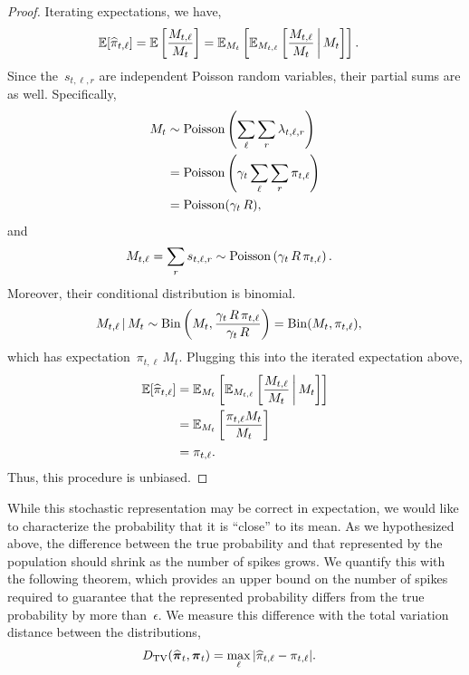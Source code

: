 \begin{proof}
  Iterating expectations, we have,
  \begin{align}
    \mathbb{E}[\widehat{\pi}_{t,\ell}] &=
    \mathbb{E} \left[ \frac{M_{t, \ell}}{M_{t}} \right] 
    = \mathbb{E}_{M_t} \left[
      \mathbb{E}_{M_{t,\ell}} \left[
        \frac{M_{t,\ell}}{M_t} \, \bigg|\,
        M_{t}  \right] \right].
  \end{align}
  Since the~$s_{t, \ell, r}$ are independent Poisson random variables, their partial
  sums are as well. Specifically,
  \begin{align}
    M_t &\sim \mathrm{Poisson} \left( \sum_{\ell} \sum_{r} \lambda_{t,\ell,r} \right) \\
    &= \mathrm{Poisson} \left(\gamma_t \sum_\ell \sum_r \pi_{t,\ell} \right) \\
    \label{eq:M_t_rate}
    &= \mathrm{Poisson}(\gamma_t \, R),
  \end{align}
  and
  \begin{align}
        M_{t,\ell} = \sum_r s_{t, \ell, r} &\sim \mathrm{Poisson} \left( \gamma_t \, R \, \pi_{t, \ell} \right).
  \end{align}
  Moreover, their conditional distribution is binomial.
  \begin{align}
    M_{t,\ell} \,|\, M_t &\sim
    \mathrm{Bin} \left( M_t, \frac{\gamma_t \, R \, \pi_{t,\ell}}{\gamma_t \, R} \right)
    =\mathrm{Bin}(M_t, \pi_{t,\ell}),
  \end{align}
  which has expectation~$\pi_{t,\ell} \, M_t$.
  Plugging this into the iterated expectation above, 
  \begin{align}
    \mathbb{E}[\widehat{\pi}_{t,\ell}]
    &= \mathbb{E}_{M_t} \left[
      \mathbb{E}_{M_{t,\ell}} \left[
        \frac{M_{t,\ell}}{M_t} \, \bigg|\,
        M_t  \right] \right] \\
    &= \mathbb{E}_{M_t} \left[ 
      \frac{\pi_{t,\ell} M_t}{M_t} \right]\\
    &= \pi_{t,\ell}.
  \end{align}
  Thus, this procedure is unbiased.
\end{proof}

While this stochastic representation may be correct in expectation, we
would like to characterize the probability that it is ``close'' to its
mean. As we hypothesized above, the difference between the true
probability and that represented by the population should shrink as
the number of spikes grows. We quantify this with the following
theorem, which provides an upper bound on the number of spikes
required to guarantee that the represented probability differs from
the true probability by more than~$\epsilon$. We measure this
difference with the total variation distance between the
distributions,
\begin{align}
  {D_{\mathrm{TV}}}(\widehat{\boldsymbol{\pi}}_t, \boldsymbol{\pi}_t) &= 
  \max_{\ell} |\widehat{\pi}_{t,\ell} - \pi_{t,\ell}|.
\end{align}

